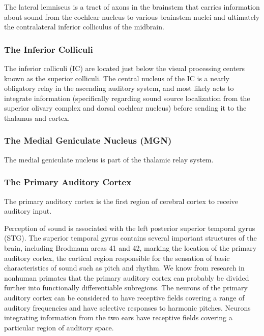 The lateral lemniscus is a tract of axons in the brainstem that carries
information about sound from the cochlear nucleus to various brainstem
nuclei and ultimately the contralateral inferior colliculus of the
midbrain.

\hypertarget{the-inferior-colliculi}{%
\subsubsection{The Inferior Colliculi}\label{the-inferior-colliculi}}

The inferior colliculi (IC) are located just below the visual processing
centers known as the superior colliculi. The central nucleus of the IC
is a nearly obligatory relay in the ascending auditory system, and most
likely acts to integrate information (specifically regarding sound
source localization from the superior olivary complex and dorsal
cochlear nucleus) before sending it to the thalamus and cortex.

\hypertarget{the-medial-geniculate-nucleus-mgn}{%
\subsubsection{The Medial Geniculate Nucleus
(MGN)}\label{the-medial-geniculate-nucleus-mgn}}

The medial geniculate nucleus is part of the thalamic relay system.

\hypertarget{the-primary-auditory-cortex}{%
\subsubsection{The Primary Auditory
Cortex}\label{the-primary-auditory-cortex}}

The primary auditory cortex is the first region of cerebral cortex to
receive auditory input.

Perception of sound is associated with the left posterior superior
temporal gyrus (STG). The superior temporal gyrus contains several
important structures of the brain, including Brodmann areas 41 and 42,
marking the location of the primary auditory cortex, the cortical region
responsible for the sensation of basic characteristics of sound such as
pitch and rhythm. We know from research in nonhuman primates that the
primary auditory cortex can probably be divided further into
functionally differentiable subregions. The neurons of the primary
auditory cortex can be considered to have receptive fields covering a
range of auditory frequencies and have selective responses to harmonic
pitches. Neurons integrating information from the two ears have
receptive fields covering a particular region of auditory space.

